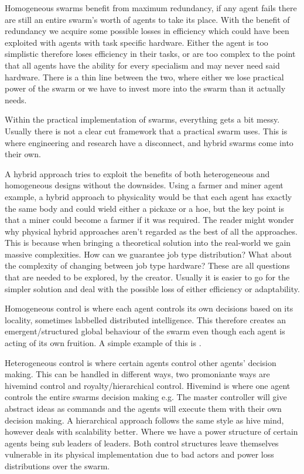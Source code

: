 \documentclass{UoYCSproject}
\begin{document}
Homogeneous swarms benefit from maximum redundancy, if any agent fails there are still an entire swarm's worth of agents to take its place.
With the benefit of redundancy we acquire some possible losses in efficiency which could have been exploited with agents with task specific hardware.
Either the agent is too simplistic therefore loses efficiency in their tasks, or are too complex to the point that all agents have the ability for every specialism and may never need said hardware.
There is a thin line between the two, where either we lose practical power of the swarm or we have to invest more into the swarm than it actually needs.

Within the practical implementation of swarms, everything gets a bit messy.
Usually there is not a clear cut framework that a practical swarm uses.
This is where engineering and research have a disconnect, and hybrid swarms come into their own.

A hybrid approach tries to exploit the benefits of both heterogeneous and homogeneous designs without the downsides.
Using a farmer and miner agent example, a hybrid approach to physicality would be that each agent has exactly the same body and could wield either a pickaxe or a hoe, but the key point is that a miner could become a farmer if it was required.
The reader might wonder why physical hybrid approaches aren’t regarded as the best of all the approaches.
This is because when bringing a theoretical solution into the real-world we gain massive complexities.
How can we guarantee job type distribution?
What about the complexity of changing between job type hardware?
These are all questions that are needed to be explored, by the creator.
Usually it is easier to go for the simpler solution and deal with the possible loss of either efficiency or adaptability.

Homogeneous control is where each agent controls its own decisions based on its locality, sometimes labbelled distributed intelligence.
This therefore creates an emergent/structured global behaviour of the swarm even though each agent is acting of its own fruition.
A simple example of this is \cite{Boids}.

Heterogeneous control is where certain agents control other agents' decision making.
This can be handled in different ways, two promoniante ways are hivemind control \cite{HiveMind} and royalty/hierarchical control.
Hivemind is where one agent controls the entire swarms decision making e.g. The master controller will give abstract ideas as commands and the agents will execute them with their own decision making.
A hierarchical approach follows the same style as hive mind, however deals with scalability better.
Where we have a power structure of certain agents being sub leaders of leaders.
Both control structures leave themselves vulnerable in its physical implementation due to bad actors and power loss distributions over the swarm.
\end{document}
